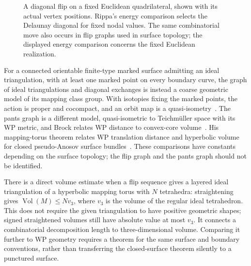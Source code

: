\documentclass[11pt,a4paper]{article}
\numberwithin{equation}{section}
\theoremstyle{definition}
\theoremstyle{remark}
\begin{document}
\begin{figure}[htbp]
\caption[A diagonal exchange and the Delaunay energy comparison]{A diagonal flip on a fixed Euclidean quadrilateral, shown
with its actual vertex positions. Rippa's energy comparison selects the
Delaunay diagonal for fixed nodal values. The same combinatorial move
also occurs in flip graphs used in surface topology; the displayed
energy comparison concerns the fixed Euclidean realization.}
\label{fig:mono-flip}
\end{figure}

For a connected orientable finite-type marked surface admitting an ideal
triangulation, with at least one marked point on every boundary curve,
the graph of ideal triangulations and diagonal exchanges is instead
a coarse geometric model of its mapping class group. With isotopies
fixing the marked points, the action is proper and cocompact, and an
orbit map is a quasi-isometry~\cite[Section~2.1, Lemma~2.3]{DisarloParlier}.
The pants graph is a different
model, quasi-isometric to Teichm\"uller space with its WP metric, and
Brock relates WP distance to convex-core volume~\cite{BrockWPVolumes}.
His mapping-torus theorem relates WP translation distance and hyperbolic
volume for closed pseudo-Anosov surface bundles~\cite{BrockMappingTori}.
These comparisons have constants depending on the surface topology;
the flip graph and the pants graph should not be identified.

There is a direct volume estimate when a flip sequence gives a layered
ideal triangulation of a hyperbolic mapping torus with $N$ tetrahedra:
straightening gives $\operatorname{Vol}(M)\le Nv_3$, where $v_3$ is the
volume of the regular ideal tetrahedron. This does not require the
given triangulation to have positive geometric shapes; signed
straightened volumes still have absolute value at most $v_3$.
It connects a combinatorial decomposition length to three-dimensional
volume. Comparing it further to WP geometry requires a theorem for the
same surface and boundary conventions, rather than transferring the
closed-surface theorem silently to a punctured surface.
\end{document}
